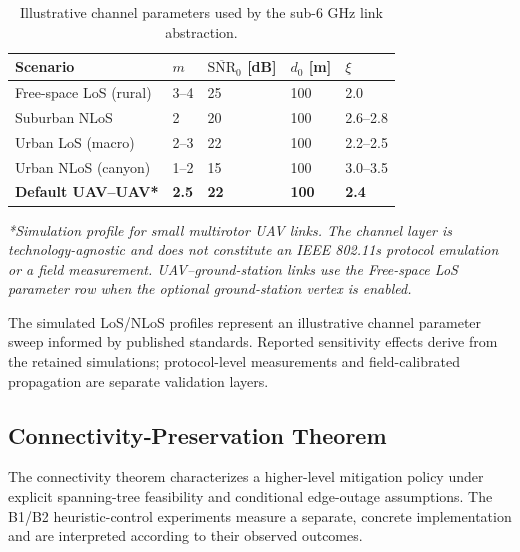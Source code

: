 \documentclass[preprint,12pt]{elsarticle}
\newcommand{\plExp}{\xi}
\theoremstyle{definition}\newtheorem{definition}{Definition}
\theoremstyle{plain}\newtheorem{theorem}{Theorem}
\theoremstyle{plain}\newtheorem{lemma}{Lemma}
\theoremstyle{plain}\newtheorem{corollary}{Corollary}
\theoremstyle{plain}\newtheorem{assumption}{Assumption}
\theoremstyle{remark}\newtheorem{remark}[theorem]{Remark}
\begin{document}
\begin{table}[H]
  \centering
  \caption{Illustrative channel parameters used by the sub-6 GHz link abstraction.}
  \label{tab:nakagami_params}
  \renewcommand{\arraystretch}{1.15}
  \begin{tabular}{@{}lllll@{}}
    \toprule
    \textbf{Scenario} & $m$ & $\overline{\mathrm{SNR}}_0$ [dB] & $d_0$ [m] & $\plExp$ \\
    \midrule
    Free-space LoS (rural)   & 3–4 & 25 & 100 & 2.0 \\
    Suburban NLoS            & 2   & 20 & 100 & 2.6–2.8 \\
    Urban LoS (macro)        & 2–3 & 22 & 100 & 2.2–2.5 \\
    Urban NLoS (canyon)      & 1–2 & 15 & 100 & 3.0–3.5 \\
    \textbf{Default UAV–UAV*}& \textbf{2.5} & \textbf{22} & \textbf{100} & \textbf{2.4} \\
    \bottomrule
  \end{tabular}
  \vspace{-0.35em}
  \begin{minipage}{0.9\linewidth}\footnotesize
    \emph{*Simulation profile for small multirotor UAV links. The channel layer is technology-agnostic and does not constitute an IEEE 802.11s protocol emulation or a field measurement. UAV--ground-station links use the Free-space LoS parameter row when the optional ground-station vertex is enabled.}
  \end{minipage}
\end{table}

The simulated LoS/NLoS profiles represent an illustrative channel parameter sweep informed by published standards. Reported sensitivity effects derive from the retained simulations; protocol-level measurements and field-calibrated propagation are separate validation layers.

\subsection{Connectivity‐Preservation Theorem}
\label{subsec:connectivity_theorem}

The connectivity theorem characterizes a higher-level mitigation policy under explicit spanning-tree feasibility and conditional edge-outage assumptions. The B1/B2 heuristic-control experiments measure a separate, concrete implementation and are interpreted according to their observed outcomes.
\end{document}
